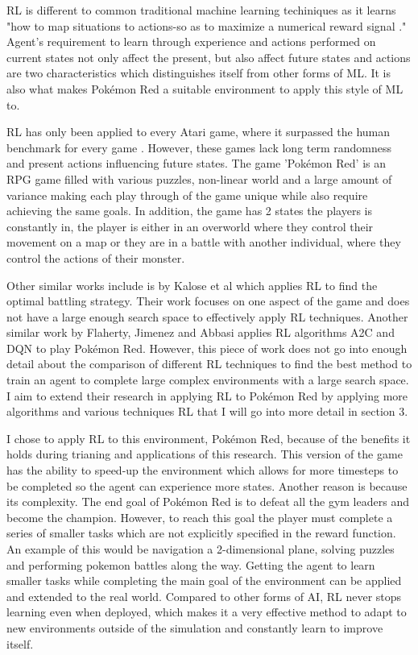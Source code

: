 \documentclass{surrey_disso_style}
\begin{document}
RL is different to common traditional machine learning techiniques as it learns "how to map situations to actions-so as to maximize 
a numerical reward signal \cite{Sutton1}." Agent's requirement to learn through experience and actions performed on current states 
not only affect the present, but also affect future states and actions are two characteristics which distinguishes itself from other 
forms of ML. It is also what makes Pokémon Red a suitable environment to apply this style of ML to. 
\par

RL has only been applied to every Atari game, where it surpassed the human benchmark for every game \cite{brockman2016openai}. 
However, these games lack long term randomness and present actions influencing future states. The game 'Pokémon Red' is an RPG game 
filled with various puzzles, non-linear world and a large amount of variance making each play through of the game unique while also 
require achieving the same goals. In addition, the game has 2 states the players is constantly in, the player is either in an 
overworld where they control their movement on a map or they are in a battle with another individual, where they control the actions 
of their monster.
\par

Other similar works include is by Kalose et al \cite{kalose2018optimal} which applies RL to find the optimal battling strategy. 
Their work focuses on one aspect of the game and does not have a large enough search space to effectively apply RL techniques. 
Another similar work by Flaherty, Jimenez and Abbasi \cite{flaherty2021playing} applies RL algorithms A2C and DQN to play Pokémon 
Red. However, this piece of work does not go into enough detail about the comparison of different RL techniques to find the best
 method to train an agent to complete large complex environments with a large search space. I aim to extend their research in 
 applying RL to Pokémon Red by applying more algorithms and various techniques RL that I will go into more detail in section 3.
\par

I chose to apply RL to this environment, Pokémon Red, because of the benefits it holds during trianing and applications of this 
research. This version of the game has the ability to speed-up the environment which allows for more timesteps to be completed 
so the agent can experience more states. Another reason is because its complexity. The end goal of Pokémon Red is to defeat all the 
gym leaders and become the champion. However, to reach this goal the player must complete a series of smaller tasks which are not 
explicitly specified in the reward function. An example of this would be navigation a 2-dimensional plane, solving puzzles and
 performing pokemon battles along the way. Getting the agent to learn smaller tasks while completing the main goal of the environment 
 can be applied and extended to the real world. Compared to other forms of AI, RL never stops learning even when deployed, which makes
 it a very effective method to adapt to new environments outside of the simulation and constantly learn to improve itself. 
\end{document}
